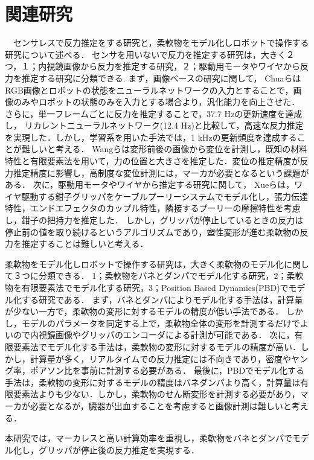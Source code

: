 \documentclass[a4paper]{jarticle}
\begin{document}
\section{関連研究}
　センサレスで反力推定をする研究と，柔軟物をモデル化しロボットで操作する研究について述べる．
センサを用いないで反力を推定する研究は，大きく２つ，１；内視鏡画像から反力を推定する研究，２；駆動用モータやワイヤから反力を推定する研究に分類できる.
まず，画像ベースの研究に関して，
ChuaらはRGB画像とロボットの状態をニューラルネットワークの入力とすることで，画像のみやロボットの状態のみを入力とする場合より，汎化能力を向上させた\cite{ref_Chua}．
さらに，単一フレームごとに反力を推定することで，37.7 Hzの更新速度を達成し，
リカレントニューラルネットワーク(12.4 Hz)と比較して，高速な反力推定を実現した．しかし，学習系を用いた手法では，1 kHzの更新頻度を達成することが難しいと考える．
Wangらは変形前後の画像から変位を計測し，既知の材料特性と有限要素法を用いて，力の位置と大きさを推定した\cite{ref_Wang}．変位の推定精度が反力推定精度に影響し，高制度な変位計測には，マーカが必要となるという課題がある．
次に，駆動用モータやワイヤから推定する研究に関して，
Xueらは，ワイヤ駆動する鉗子グリッパをケーブルプーリーシステムでモデル化し，張力伝達特性，エンドエフェクタのカップル特性，隣接するプーリーの摩擦特性を考慮し，鉗子の把持力を推定した\cite{ref_Xue}．
しかし，グリッパが停止しているときの反力は停止前の値を取り続けるというアルゴリズムであり，塑性変形が進む柔軟物の反力を推定することは難しいと考える．

柔軟物をモデル化しロボットで操作する研究は，大きく柔軟物のモデル化に関して３つに分類できる\cite{ref_review_modeling}．
1；柔軟物をバネとダンパでモデル化する研究，2；柔軟物を有限要素法でモデル化する研究，3；Position Based Dynamics(PBD)でモデル化する研究である．
まず，バネとダンパによりモデル化する手法は，計算量が少ない一方で，柔軟物の変形に対するモデルの精度が低い手法である\cite{ref_MSD}．
しかし，モデルのパラメータを同定する上で，柔軟物全体の変形を計測するだけでよいので内視鏡画像やグリッパのエンコーダによる計測が可能である．
次に，有限要素法でモデル化する手法は，柔軟物の変形に対するモデルの精度が高い\cite{ref_FEM}．しかし，計算量が多く，リアルタイムでの反力推定には不向きであり，密度やヤング率，ポアソン比を事前に計測する必要がある．
最後に，PBDでモデル化する手法は，柔軟物の変形に対するモデルの精度はバネダンパより高く，計算量は有限要素法よりも少ない\cite{ref_PBD}．しかし，柔軟物のせん断変形を計測する必要があり，マーカが必要となるが，臓器が出血することを考慮すると画像計測は難しいと考える．

本研究では，マーカレスと高い計算効率を重視し，柔軟物をバネとダンパでモデル化し，グリッパが停止後の反力推定を実現する．
\end{document}
